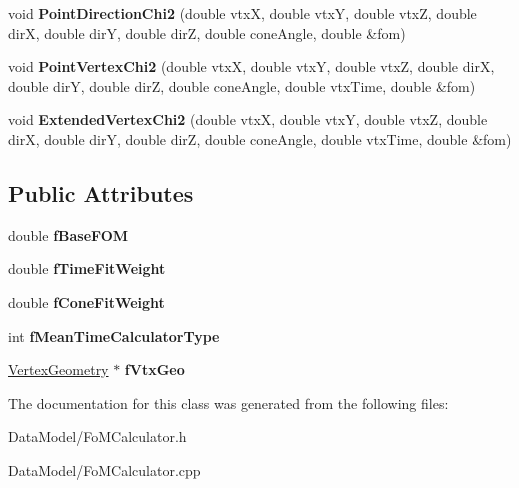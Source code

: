 \begin{DoxyCompactItemize}
\item 
\hypertarget{classFoMCalculator_a275afaff36e1d93e732811382c433566}{void {\bfseries Point\-Direction\-Chi2} (double vtx\-X, double vtx\-Y, double vtx\-Z, double dir\-X, double dir\-Y, double dir\-Z, double cone\-Angle, double \&fom)}\label{classFoMCalculator_a275afaff36e1d93e732811382c433566}

\item 
\hypertarget{classFoMCalculator_a6fc036ee8918755886ffa842e5c5d781}{void {\bfseries Point\-Vertex\-Chi2} (double vtx\-X, double vtx\-Y, double vtx\-Z, double dir\-X, double dir\-Y, double dir\-Z, double cone\-Angle, double vtx\-Time, double \&fom)}\label{classFoMCalculator_a6fc036ee8918755886ffa842e5c5d781}

\item 
\hypertarget{classFoMCalculator_a419589ed8639a623dec06684e57d0db5}{void {\bfseries Extended\-Vertex\-Chi2} (double vtx\-X, double vtx\-Y, double vtx\-Z, double dir\-X, double dir\-Y, double dir\-Z, double cone\-Angle, double vtx\-Time, double \&fom)}\label{classFoMCalculator_a419589ed8639a623dec06684e57d0db5}

\end{DoxyCompactItemize}
\subsection*{Public Attributes}
\begin{DoxyCompactItemize}
\item 
\hypertarget{classFoMCalculator_a3a7bca0306b8b1570e639b863ed7e92e}{double {\bfseries f\-Base\-F\-O\-M}}\label{classFoMCalculator_a3a7bca0306b8b1570e639b863ed7e92e}

\item 
\hypertarget{classFoMCalculator_ae9c9449bfa160d8c5d241ab3b729a10b}{double {\bfseries f\-Time\-Fit\-Weight}}\label{classFoMCalculator_ae9c9449bfa160d8c5d241ab3b729a10b}

\item 
\hypertarget{classFoMCalculator_a74a5ae95c46e77c0d70f346ddf5ac7b4}{double {\bfseries f\-Cone\-Fit\-Weight}}\label{classFoMCalculator_a74a5ae95c46e77c0d70f346ddf5ac7b4}

\item 
\hypertarget{classFoMCalculator_ae80b01958ac5f9513b46406ac46ac486}{int {\bfseries f\-Mean\-Time\-Calculator\-Type}}\label{classFoMCalculator_ae80b01958ac5f9513b46406ac46ac486}

\item 
\hypertarget{classFoMCalculator_a8962e8746e1e5a857c73c1d3c2b350ee}{\hyperlink{classVertexGeometry}{Vertex\-Geometry} $\ast$ {\bfseries f\-Vtx\-Geo}}\label{classFoMCalculator_a8962e8746e1e5a857c73c1d3c2b350ee}

\end{DoxyCompactItemize}


The documentation for this class was generated from the following files\-:\begin{DoxyCompactItemize}
\item 
Data\-Model/Fo\-M\-Calculator.\-h\item 
Data\-Model/Fo\-M\-Calculator.\-cpp\end{DoxyCompactItemize}
